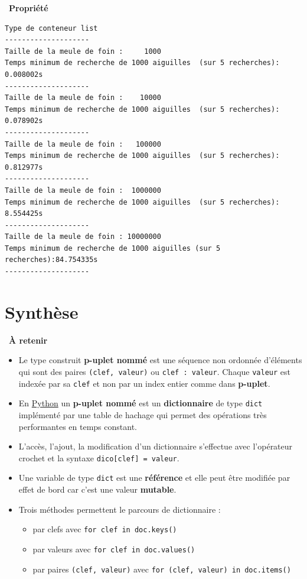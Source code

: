 \documentclass[
  11pt,
]{article}
\newcommand{\passthrough}[1]{#1}
\providecommand{\tightlist}{%
  \setlength{\itemsep}{0pt}\setlength{\parskip}{0pt}}
\newcounter{prop}
\newenvironment{propriete}[1]
{\par \medskip   \addtocounter{prop}{1} \noindent  
\begin{bclogo}[arrondi =0.1,  ombre = true, barre=none, logo=\bcbook, marge=4]{~\textbf{Propriété} \textbf{\theprop} {\itshape #1} }   \par}
{
\end{bclogo}
 \par \bigskip }
\newcounter{cours}
\newenvironment{memo}[1]
{\par \medskip    \noindent  
\begin{bclogo}[arrondi =0.1,  ombre = true, barre=none, logo=\bccle, marge=4]{~\textbf{À retenir}  {\itshape #1} }  \par}
{
\end{bclogo}
 \par \bigskip }
\begin{document}
\begin{propriete}{}
\begin{lstlisting}
Type de conteneur list
--------------------
Taille de la meule de foin :     1000
Temps minimum de recherche de 1000 aiguilles  (sur 5 recherches): 0.008002s
--------------------
Taille de la meule de foin :    10000
Temps minimum de recherche de 1000 aiguilles  (sur 5 recherches): 0.078902s
--------------------
Taille de la meule de foin :   100000
Temps minimum de recherche de 1000 aiguilles  (sur 5 recherches): 0.812977s
--------------------
Taille de la meule de foin :  1000000
Temps minimum de recherche de 1000 aiguilles  (sur 5 recherches): 8.554425s
--------------------
Taille de la meule de foin : 10000000
Temps minimum de recherche de 1000 aiguilles (sur 5 recherches):84.754335s
--------------------
\end{lstlisting}

\end{propriete}

\hypertarget{synthuxe8se}{%
\section{Synthèse}\label{synthuxe8se}}

\begin{memo}{}

\begin{itemize}
\tightlist
\item
  Le type construit \textbf{p-uplet nommé} est une séquence non ordonnée
  d'éléments qui sont des paires
  \passthrough{\lstinline!(clef, valeur)!} ou
  \passthrough{\lstinline!clef : valeur!}. Chaque
  \passthrough{\lstinline!valeur!} est indexée par sa
  \passthrough{\lstinline!clef!} et non par un index entier comme dans
  \textbf{p-uplet}.
\item
  En
  \href{https://docs.python.org/3/tutorial/datastructures.html}{Python}
  un \textbf{p-uplet nommé} est un \textbf{dictionnaire} de type
  \passthrough{\lstinline!dict!} implémenté par une table de hachage qui
  permet des opérations très performantes en temps constant.
\item
  L'accès, l'ajout, la modification d'un dictionnaire s'effectue avec
  l'opérateur crochet et la syntaxe
  \passthrough{\lstinline!dico[clef] = valeur!}.
\item
  Une variable de type \passthrough{\lstinline!dict!} est une
  \textbf{référence} et elle peut être modifiée par effet de bord car
  c'est une valeur \textbf{mutable}.
\item
  Trois méthodes permettent le parcours de dictionnaire :

  \begin{itemize}
  \tightlist
  \item
    par clefs avec \passthrough{\lstinline!for clef in doc.keys()!}
  \item
    par valeurs avec \passthrough{\lstinline!for clef in doc.values()!}
  \item
    par paires \passthrough{\lstinline!(clef, valeur)!} avec
    \passthrough{\lstinline!for (clef, valeur) in doc.items()!}
  \end{itemize}
\end{itemize}

\end{memo}
\end{document}
